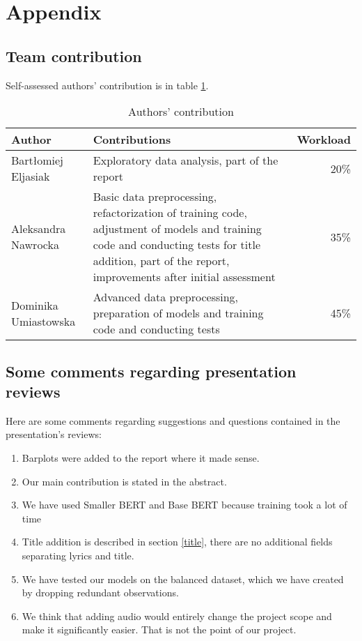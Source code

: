 \section{Appendix}

\subsection{Team contribution}
Self-assessed authors' contribution is in table \ref{tab:contribution}.

\begin{table}[h]
\centering
\begin{tabularx}{0.5\textwidth}{XXr}
\textbf{Author} & \textbf{Contributions} & \textbf{Workload} \\\hline
Bartłomiej \mbox{Eljasiak} & Exploratory data analysis, part of the report & 20\% \\\hline
Aleksandra Nawrocka & Basic data preprocessing, refactorization of training code, adjustment of models and training code and conducting tests for title addition, part of the report, improvements after initial assessment & 35\% \\\hline
Dominika \mbox{Umiastowska} & Advanced data preprocessing, preparation of models and training code and conducting tests & 45\% \\
\end{tabularx}
\caption{Authors' contribution}
\label{tab:contribution}
\end{table}

\subsection{Some comments regarding presentation reviews}

Here are some comments regarding suggestions and questions contained in the presentation's reviews:
\begin{enumerate}
    \item Barplots were added to the report where it made sense.
    \item Our main contribution is stated in the abstract.
    \item We have used Smaller BERT and Base BERT because training took a lot of time
    \item Title addition is described in section \ref{title}, there are no additional fields separating lyrics and title.
    \item We have tested our models on the balanced dataset, which we have created by dropping redundant observations.
    \item We think that adding audio would entirely change the project scope and make it significantly easier. That is not the point of our project.
\end{enumerate}

